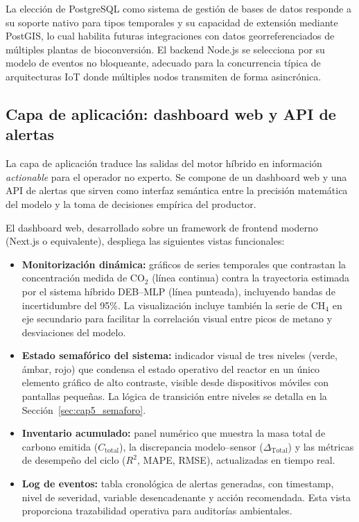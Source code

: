 La elección de PostgreSQL como sistema de gestión de bases de datos responde a su soporte nativo para tipos temporales y su capacidad de extensión mediante PostGIS, lo cual habilita futuras integraciones con datos georreferenciados de múltiples plantas de bioconversión. El backend Node.js se selecciona por su modelo de eventos no bloqueante, adecuado para la concurrencia típica de arquitecturas IoT donde múltiples nodos transmiten de forma asincrónica.

\subsection{Capa de aplicación: dashboard web y API de alertas}
\label{subsec:cap5_capa_aplicacion}

La capa de aplicación traduce las salidas del motor híbrido en información \emph{actionable} para el operador no experto. Se compone de un dashboard web y una API de alertas que sirven como interfaz semántica entre la precisión matemática del modelo y la toma de decisiones empírica del productor.

El dashboard web, desarrollado sobre un framework de frontend moderno (Next.js o equivalente), despliega las siguientes vistas funcionales:

\begin{itemize}
    \item \textbf{Monitorización dinámica:} gráficos de series temporales que contrastan la concentración medida de CO$_2$ (línea continua) contra la trayectoria estimada por el sistema híbrido DEB--MLP (línea punteada), incluyendo bandas de incertidumbre del 95\%. La visualización incluye también la serie de CH$_4$ en eje secundario para facilitar la correlación visual entre picos de metano y desviaciones del modelo.
    
    \item \textbf{Estado semafórico del sistema:} indicador visual de tres niveles (verde, ámbar, rojo) que condensa el estado operativo del reactor en un único elemento gráfico de alto contraste, visible desde dispositivos móviles con pantallas pequeñas. La lógica de transición entre niveles se detalla en la Sección~\ref{sec:cap5_semaforo}.
    
    \item \textbf{Inventario acumulado:} panel numérico que muestra la masa total de carbono emitida ($C_{\mathrm{total}}$), la discrepancia modelo--sensor ($\Delta_{\mathrm{Total}}$) y las métricas de desempeño del ciclo ($R^2$, MAPE, RMSE), actualizadas en tiempo real.
    
    \item \textbf{Log de eventos:} tabla cronológica de alertas generadas, con timestamp, nivel de severidad, variable desencadenante y acción recomendada. Esta vista proporciona trazabilidad operativa para auditorías ambientales.
\end{itemize}

